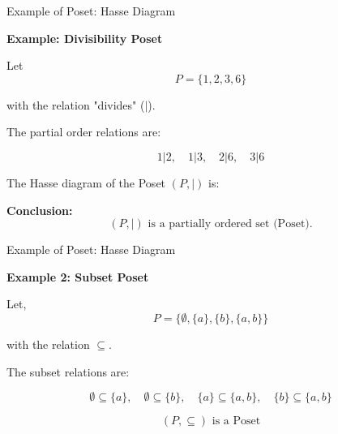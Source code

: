 \documentclass{beamer}
\begin{document}
\begin{frame}{Example of Poset: Hasse Diagram}

\textbf{Example: Divisibility Poset}

Let 
\[
P=\{1,2,3,6\}
\]

with the relation "divides" (\(|\)).

The partial order relations are:

\[
1|2,\quad 1|3,\quad 2|6,\quad 3|6
\]

The Hasse diagram of the Poset \((P,|)\) is:

\vspace{0.5cm}

\begin{center}
\end{center}

\textbf{Conclusion:}
\[
(P,|) \text{ is a partially ordered set (Poset).}
\]

\end{frame}

\begin{frame}{Example of Poset: Hasse Diagram}

\textbf{Example 2: Subset Poset}

Let,
\[
P=\{\emptyset,\{a\},\{b\},\{a,b\}\}
\]

with the relation \(\subseteq\).

The subset relations are:

\[
\emptyset \subseteq \{a\},\quad
\emptyset \subseteq \{b\},\quad
\{a\}\subseteq\{a,b\},\quad
\{b\}\subseteq\{a,b\}
\]

\begin{center}
\end{center}

\[
(P,\subseteq) \text{ is a Poset}
\]

\end{frame}
\end{document}
